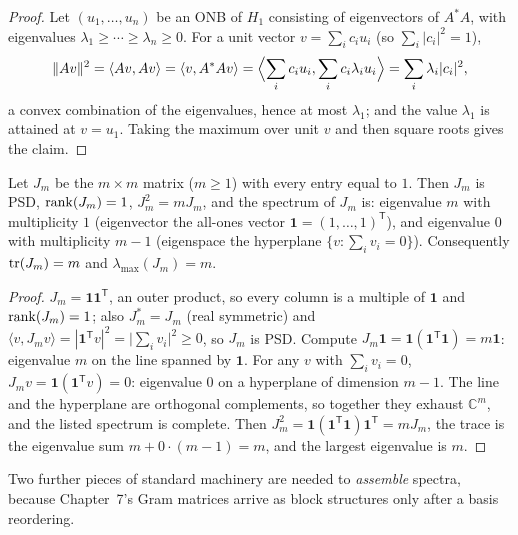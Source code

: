 \begin{proof}
Let $(u_1, \dots, u_n)$ be an ONB of $H_1$ consisting of eigenvectors of
$A^{*} A$, with eigenvalues $\lambda_1 \geq \cdots \geq \lambda_n \geq 0$.
For a unit vector $v = \sum_i c_i u_i$ (so $\sum_i |c_i|^2 = 1$),
\[
\lVert A v \rVert^{2}
= \langle A v, A v \rangle
= \langle v, A^{*} A v \rangle
= \Bigl\langle \sum_i c_i u_i, \sum_i c_i \lambda_i u_i \Bigr\rangle
= \sum_i \lambda_i |c_i|^{2},
\]
a convex combination of the eigenvalues, hence at most $\lambda_1$; and
the value $\lambda_1$ is attained at $v = u_1$. Taking the maximum over
unit $v$ and then square roots gives the claim.
\end{proof}

\begin{proposition}\label{ch02:prop:allones}
Let $J_m$ be the $m \times m$ matrix ($m \geq 1$) with every entry equal
to $1$. Then $J_m$ is PSD, $\mathrm{rank}(J_m) = 1$, $J_m^2 = m J_m$, and the
spectrum of $J_m$ is: eigenvalue $m$ with multiplicity $1$ (eigenvector
the all-ones vector $\mathbf{1} = (1, \dots, 1)^{\mathsf{T}}$), and
eigenvalue $0$ with multiplicity $m - 1$ (eigenspace the hyperplane
$\{ v : \sum_i v_i = 0 \}$). Consequently $\mathrm{tr}(J_m) = m$ and
$\lambda_{\max}(J_m) = m$.
\end{proposition}

\begin{proof}
$J_m = \mathbf{1} \mathbf{1}^{\mathsf{T}}$, an outer product, so every
column is a multiple of $\mathbf{1}$ and $\mathrm{rank}(J_m) = 1$; also
$J_m^{*} = J_m$ (real symmetric) and $\langle v, J_m v \rangle =
|\mathbf{1}^{\mathsf{T}} v|^{2} = \bigl| \sum_i v_i \bigr|^{2} \geq 0$, so
$J_m$ is PSD. Compute
$J_m \mathbf{1} = \mathbf{1} (\mathbf{1}^{\mathsf{T}} \mathbf{1}) =
m \mathbf{1}$: eigenvalue $m$ on the line spanned by $\mathbf{1}$. For
any $v$ with $\sum_i v_i = 0$,
$J_m v = \mathbf{1} (\mathbf{1}^{\mathsf{T}} v) = 0$: eigenvalue $0$ on a
hyperplane of dimension $m - 1$. The line and the hyperplane are
orthogonal complements, so together they exhaust $\mathbb{C}^{m}$, and
the listed spectrum is complete. Then
$J_m^{2} = \mathbf{1} (\mathbf{1}^{\mathsf{T}} \mathbf{1})
\mathbf{1}^{\mathsf{T}} = m J_m$, the trace is the eigenvalue sum
$m + 0 \cdot (m-1) = m$, and the largest eigenvalue is $m$.
\end{proof}

Two further pieces of standard machinery are needed to \emph{assemble}
spectra, because Chapter~7's Gram matrices arrive as block structures
only after a basis reordering.

